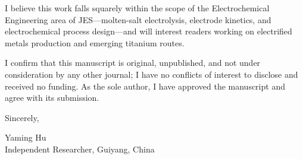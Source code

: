 \documentclass[11pt,a4paper]{article}
\begin{document}
I believe this work falls squarely within the scope of the Electrochemical Engineering area of JES---molten-salt electrolysis, electrode kinetics, and electrochemical process design---and will interest readers working on electrified metals production and emerging titanium routes.

I confirm that this manuscript is original, unpublished, and not under consideration by any other journal; I have no conflicts of interest to disclose and received no funding. As the sole author, I have approved the manuscript and agree with its submission.

\vspace{0.5em}

Sincerely,

\vspace{0.5em}

Yaming Hu\\
Independent Researcher, Guiyang, China
\end{document}
